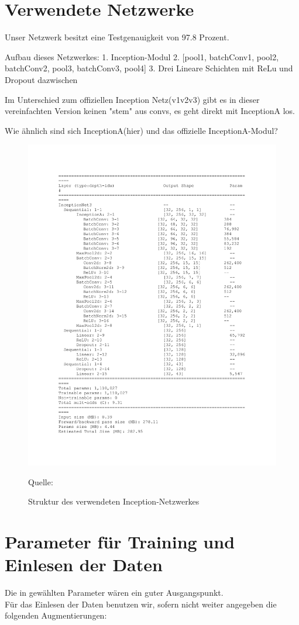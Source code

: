 \documentclass[11pt,a4paper]{article}
\newcommand{\source}[1]{\caption*{\hfill Quelle: {#1}} }
\numberwithin{equation}{section}
\begin{document}
	
	\newpage
	\newpage
	\appendix
	\section{Verwendete Netzwerke}
	Unser Netzwerk besitzt eine Testgenauigkeit von 97.8 Prozent.
	
	Aufbau dieses Netzwerkes:
	1. Inception-Modul
	2. [pool1, batchConv1, pool2, batchConv2, pool3, batchConv3, pool4]
	3. Drei Lineare Schichten mit ReLu und Dropout dazwischen
	
	Im Unterschied zum offiziellen Inception Netz(v1v2v3) gibt es in dieser 
	vereinfachten Version keinen "stem" aus convs, 
	es geht direkt mit InceptionA los.
	
	Wie ähnlich sind sich InceptionA(hier) und das offizielle InceptionA-Modul?
	
	
	\begin{figure}
		\centering
		
		\centering
		\includegraphics[width=.7\linewidth]{inceptionNet_layout.jpg}
		
		\caption{Struktur des verwendeten Inception-Netzwerkes}
		\source{\cite{goingdeeperwithconvolutions}}
		
		\label{im:inceptionv3layout}
	\end{figure}
	
	\section{Parameter für Training und Einlesen der Daten}\label{param_net}
	Die in \cite{CH} gewählten Parameter wären ein guter Ausgangspunkt.\\
	Für das Einlesen der Daten benutzen wir, sofern nicht weiter angegeben die folgenden Augmentierungen:
	
\end{document}
